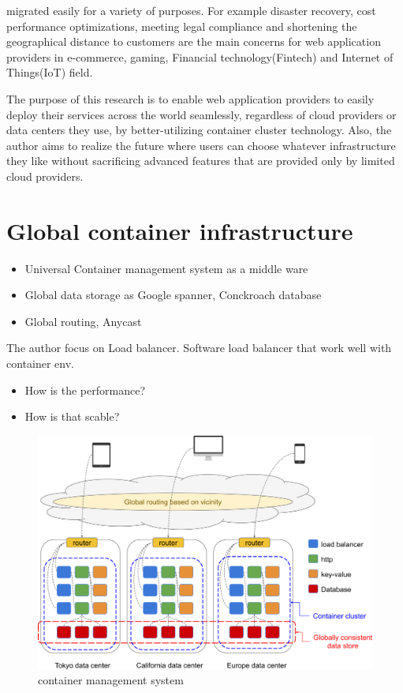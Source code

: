 migrated easily for a variety of purposes.
For example disaster recovery, cost performance optimizations, meeting legal compliance and shortening the geographical distance to customers are the main concerns for web application providers in e-commerce, gaming, Financial technology(Fintech) and Internet of Things(IoT) field.

The purpose of this research is to enable web application providers to easily deploy their services across the world seamlessly, regardless of cloud providers or data centers they use, by better-utilizing container cluster technology. 
Also, the author aims to realize the future where users can choose whatever infrastructure they like without sacrificing advanced features that are provided only by limited cloud providers.


\section{Global container infrastructure}

\begin{itemize}
\item Universal Container management system as a middle ware
\item Global data storage as Google spanner, Conckroach database
\item Global routing, Anycast 
\end{itemize}

The author focus on Load balancer.
Software load balancer that work well with container env.

\begin{itemize}
\item How is the performance?
\item How is that scable?
\end{itemize}

\begin{figure}[h]
\begin{center}
\includegraphics[width=0.9\columnwidth]{Figs/global_container_infrastructure}
\end{center}
\caption{
container management system
}

\label{fig:global_container_infrastructure}
\end{figure}



